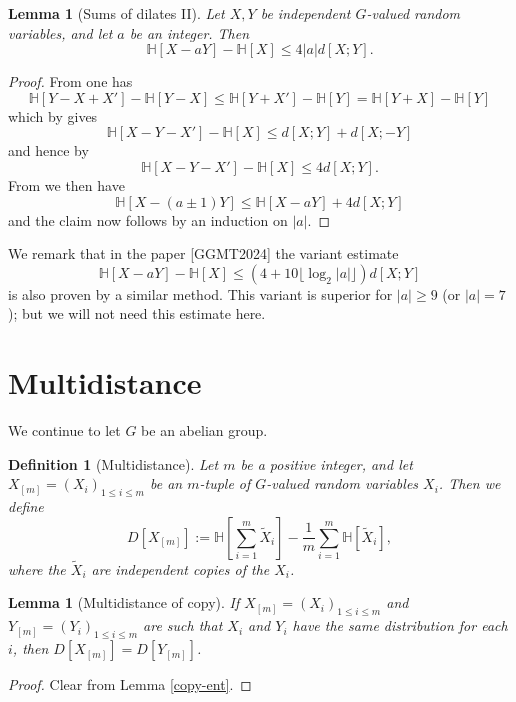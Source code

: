 \documentclass[10pt,a4paper]{article}
\newtheorem{lemma}[theorem]{Lemma}
\newtheorem{definition}[theorem]{Definition}
\newcommand{\lean}[1]{}
\newcommand{\uses}[1]{}
\newcommand{\leanok}{}
\newcommand{\bbH}{\mathbb{H}}
\begin{document}
\begin{lemma}[Sums of dilates II]\label{sum-dilate-II}\lean{ent_sub_zsmul_sub_ent_le}\leanok  Let $X,Y$ be independent $G$-valued random variables, and let $a$ be an integer.  Then
  $$\bbH[X-aY] - \bbH[X] \leq 4 |a| d[X;Y].$$
\end{lemma}

\begin{proof}\uses{kv, ruz-indep, sign-flip, sum-dilate-I}\leanok From  one has
  $$\bbH[Y-X+X'] - \bbH[Y-X] \leq \bbH[Y+X'] - \bbH[Y] = \bbH[Y+X] - \bbH[Y]$$
  which by  gives
  $$\bbH[X-Y-X'] -\bbH[X] \leq d[X;Y] + d[X;-Y]$$
  and hence by 
  $$\bbH[X-Y-X'] - \bbH[X] \leq 4d[X;Y].$$
  From  we then have
  $$\bbH[X-(a\pm 1)Y] \leq \bbH[X-aY] + 4 d[X;Y]$$
and the claim now follows by an induction on $|a|$.
\end{proof}

We remark that in the paper [GGMT2024] the variant estimate
$$\bbH[X-aY] - \bbH[X] \leq (4 + 10 \lfloor \log_2 |a| \rfloor) d[X;Y]$$
is also proven by a similar method.  This variant is superior for $|a| \geq 9$ (or $|a|=7$); but we will not need this estimate here.



\section{Multidistance}

We continue to let $G$ be an abelian group.

\begin{definition}[Multidistance]\label{multidist-def}\lean{multiDist}\leanok  Let $m$ be a positive integer, and let $X_{[m]} = (X_i)_{1 \leq i \leq m}$ be an $m$-tuple of $G$-valued random variables $X_i$. Then we define
\[
  D[X_{[m]}] := \bbH[\sum_{i=1}^m \tilde X_i] - \frac{1}{m} \sum_{i=1}^m \bbH[\tilde X_i],
\]
where the $\tilde X_i$ are independent copies of the $X_i$.
\end{definition}

\begin{lemma}[Multidistance of copy]\label{multidist-copy}\lean{multiDist_copy}\leanok  If $X_{[m]} = (X_i)_{1 \leq i \leq m}$ and $Y_{[m]} = (Y_i)_{1 \leq i \leq m}$ are such that $X_i$ and $Y_i$ have the same distribution for each $i$, then $D[X_{[m]}] = D[Y_{[m]}]$.
\end{lemma}

\begin{proof}\uses{multidist-def}\leanok Clear from Lemma \ref{copy-ent}.
\end{proof}
\end{document}
